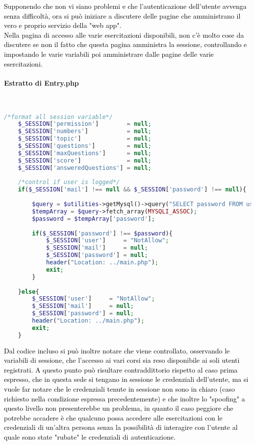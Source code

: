 \textcolor{black}{Supponendo che non vi siano problemi e che l'autenticazione dell'utente avvenga senza difficoltà, ora si può iniziare a discutere delle pagine che amministrano il vero e proprio servizio della "web app".\\
Nella pagina di accesso alle varie esercitazioni disponibili, non c'è molto cose da discutere se non il fatto che questa pagina amministra la sessione, controllando e impostando le varie variabili poi amministrare dalle pagine delle varie esercitazioni.}

\paragraph{Estratto di Entry.php}\leavevmode\\

\begin{lstlisting}[language=php]
	/*format all session variable*/
	$_SESSION['permission']        = null;
	$_SESSION['numbers']           = null;
	$_SESSION['topic']             = null;
	$_SESSION['questions']         = null;
	$_SESSION['maxQuestions']      = null;
	$_SESSION['score']             = null;
	$_SESSION['answeredQuestions'] = null;
	
	/*control if user is logged*/
	if($_SESSION['mail'] !== null && $_SESSION['password'] !== null){
		
		$query = $utilities->getMysql()->query("SELECT password FROM user_table1 WHERE (email = '{$_SESSION['mail']}')");
		$tempArray = $query->fetch_array(MYSQLI_ASSOC);
		$password = $tempArray['password'];
		
		if($_SESSION['password'] !== $password){
			$_SESSION['user']     = "NotAllow";
			$_SESSION['mail']     = null;
			$_SESSION['password'] = null;
			header("Location: ../main.php");
			exit;
		}
		
	}else{
		$_SESSION['user']     = "NotAllow";
		$_SESSION['mail']     = null;
		$_SESSION['password'] = null;
		header("Location: ../main.php");
		exit;
	}
\end{lstlisting}

\textcolor{black}{Dal codice incluso si può inoltre notare che viene controllato, osservando le variabili di sessione, che l'accesso ai vari corsi sia reso disponibile ai soli utenti registrati. A questo punto può risultare contraddittorio rispetto al caso prima espresso, che in questa sede si tengano in sessione le credenziali dell'utente, ma si vuole far notare che le credenziali tenute in sessione non sono in chiaro (caso richiesto nella condizione espressa precedentemente) e che inoltre lo "spoofing" a questo livello non presenterebbe un problema, in quanto il caso peggiore che potrebbe accadere è che qualcuno possa accedere alle esercitazioni con le  credenziali di un'altra persona senza la possibilità di interagire con l'utente al quale sono state "rubate" le credenziali di autenticazione.}\\

